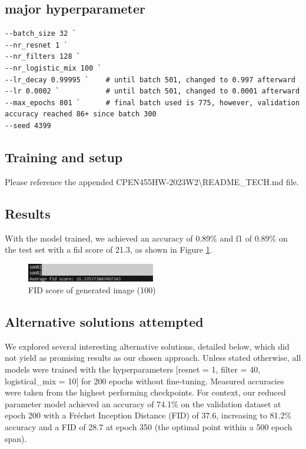 \documentclass{article}
\begin{document}
\subsection{major hyperparameter}
\begin{verbatim}
--batch_size 32 `
--nr_resnet 1 `
--nr_filters 128 `
--nr_logistic_mix 100 `
--lr_decay 0.99995 `    # until batch 501, changed to 0.997 afterward 
--lr 0.0002 `           # until batch 501, changed to 0.0001 afterward
--max_epochs 801 `      # final batch used is 775, however, validation accuracy reached 86+ since batch 300
--seed 4399
\end{verbatim}

\subsection{Training and setup}
\label{train}
Please reference the appended CPEN455HW-2023W2\textbackslash README\_TECH.md file.

\subsection{Results}
With the model trained, we achieved an accuracy of 0.89\% and f1 of 0.89\% on the test set with a fid score of 21.3, as shown in Figure \ref{fig:o-fid-fin}.

\begin{figure}
    \centering
    \includegraphics[width=0.5\textwidth]{report_data/o-fid-img.png}
    \caption{ FID score of generated image (100) }
    \label{fig:o-fid-fin}
  \end{figure}

\subsection{Alternative solutions attempted}
\label{alternative_solution}


We explored several interesting alternative solutions, detailed below, which did not yield as promising results as our chosen approach. Unless stated otherwise, all models were trained with the hyperparameters [resnet = 1, filter = 40, logistical\_mix = 10] for 200 epochs without fine-tuning. Measured accuracies were taken from the highest performing checkpoints. For context, our reduced parameter model achieved an accuracy of 74.1\% on the validation dataset at epoch 200 with a Fréchet Inception Distance (FID) of 37.6, increasing to 81.2\% accuracy and a FID of 28.7 at epoch 350 (the optimal point within a 500 epoch span).
\end{document}
